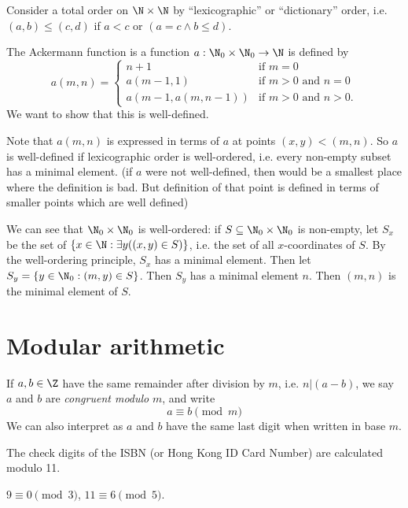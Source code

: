 \documentclass[a4paper]{article}
\begin{document}
  \begin{eg}
    Consider a total order on $\N\times \N$ by ``lexicographic'' or ``dictionary'' order, i.e. $(a, b) \leq (c, d)$ if $a < c$ or $(a = c\wedge b\leq d)$.

    The Ackermann function is a function $a:\N_0\times \N_0 \to \N$ is defined by 
    \[
      a(m, n) =\begin{cases}n+1 & \mbox{if } m = 0 \\a(m-1, 1) & \mbox{if } m > 0 \mbox{ and } n = 0 \\a(m-1, a(m, n-1)) & \mbox{if } m > 0 \mbox{ and } n > 0.\end{cases}
    \]
    We want to show that this is well-defined.

    Note that $a(m, n)$ is expressed in terms of $a$ at points $(x, y) < (m, n)$. So $a$ is well-defined if lexicographic order is well-ordered, i.e. every non-empty subset has a minimal element. (if $a$ were not well-defined, then would be a smallest place where the definition is bad. But definition of that point is defined in terms of smaller points which are well defined)

    We can see that $\N_0\times \N_0$ is well-ordered: if $S\subseteq \N_0\times \N_0$ is non-empty, let $S_x$ be the set of $\{x\in \N: \exists y((x, y)\in S)\}$, i.e. the set of all $x$-coordinates of $S$. By the well-ordering principle, $S_x$ has a minimal element. Then let $S_y = \{y\in \N_0: (m, y)\in S\}$. Then $S_y$ has a minimal element $n$. Then $(m, n)$ is the minimal element of $S$.
  \end{eg}

  \section{Modular arithmetic}
  \begin{defi}[Modulo]
    If $a, b\in \Z$ have the same remainder after division by $m$, i.e. $n | (a - b)$, we say $a$ and $b$ are \emph{congruent modulo} $m$, and write
    \[
      a\equiv b\pmod m
    \]
    We can also interpret as $a$ and $b$ have the same last digit when written in base $m$.
  \end{defi}

  \begin{eg}
    The check digits of the ISBN (or Hong Kong ID Card Number) are calculated modulo 11.
  \end{eg}

  \begin{eg}
    $9 \equiv 0\pmod 3$, $11\equiv 6\pmod 5$.
  \end{eg}
\end{document}
